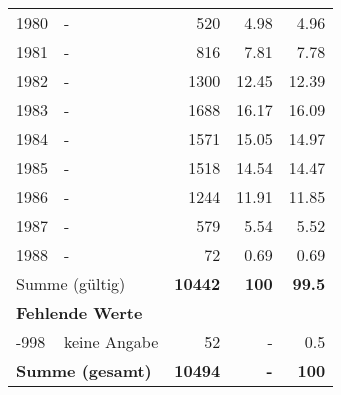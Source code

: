 \begin{longtable}{lXrrr}
        1980 & \multicolumn{1}{X}{-} & %
          \num{520} &
          \num[round-mode=places,round-precision=2]{4,98} &
          \num[round-mode=places,round-precision=2]{4,96} \\

        1981 & \multicolumn{1}{X}{-} & %
          \num{816} &
          \num[round-mode=places,round-precision=2]{7,81} &
          \num[round-mode=places,round-precision=2]{7,78} \\

        1982 & \multicolumn{1}{X}{-} & %
          \num{1300} &
          \num[round-mode=places,round-precision=2]{12,45} &
          \num[round-mode=places,round-precision=2]{12,39} \\

        1983 & \multicolumn{1}{X}{-} & %
          \num{1688} &
          \num[round-mode=places,round-precision=2]{16,17} &
          \num[round-mode=places,round-precision=2]{16,09} \\

        1984 & \multicolumn{1}{X}{-} & %
          \num{1571} &
          \num[round-mode=places,round-precision=2]{15,05} &
          \num[round-mode=places,round-precision=2]{14,97} \\

        1985 & \multicolumn{1}{X}{-} & %
          \num{1518} &
          \num[round-mode=places,round-precision=2]{14,54} &
          \num[round-mode=places,round-precision=2]{14,47} \\

        1986 & \multicolumn{1}{X}{-} & %
          \num{1244} &
          \num[round-mode=places,round-precision=2]{11,91} &
          \num[round-mode=places,round-precision=2]{11,85} \\

        1987 & \multicolumn{1}{X}{-} & %
          \num{579} &
          \num[round-mode=places,round-precision=2]{5,54} &
          \num[round-mode=places,round-precision=2]{5,52} \\

        1988 & \multicolumn{1}{X}{-} & %
          \num{72} &
          \num[round-mode=places,round-precision=2]{0,69} &
          \num[round-mode=places,round-precision=2]{0,69} \\

     \midrule
     \multicolumn{2}{l}{Summe (gültig)} &
       \textbf{\num{10442}} &
     \textbf{100} &
       \textbf{\num[round-mode=places,round-precision=2]{99,5}} \\
     \multicolumn{5}{l}{\textbf{Fehlende Werte}}\\
       -998 &
       keine Angabe &
         \num{52} &
        - &
         \num[round-mode=places,round-precision=2]{0,5} \\
     \midrule
     \multicolumn{2}{l}{\textbf{Summe (gesamt)}} &
          \textbf{\num{10494}} &
        \textbf{-} &
        \textbf{100} \\
     \bottomrule
     \end{longtable}
     

